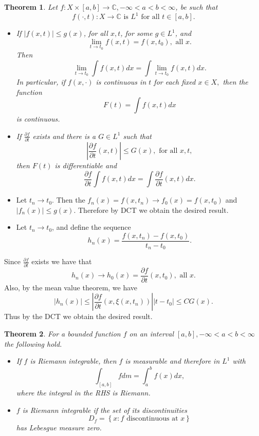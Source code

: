 \documentclass[12pt]{report}
\newtheorem{theorem}{Theorem}[section]
\begin{document}
\begin{theorem} Let $f: X \times [a,b] \longrightarrow
\mathbb{C}, - \infty < a < b < \infty$, be such that
\[ f(\cdot, t): X \longrightarrow \mathbb{C} \mbox{ is }  L^1
\mbox{ for all } t
\in [a,b].
\]
\begin{itemize}
\item[(a)]  If $|f(x, t)| \le g(x)$, for all $ x, t$, for some $g \in L^1$, and
\[
\lim_{t \to t_0} f(x, t) = f(x, t_0), \mbox{ all } x.
\] Then
\[
\lim_{t \to t_0} \int f(x, t) dx = \int \lim_{t \to t_0} f(x, t) dx.
\] In particular, if $f(x, \cdot)$ is continuous in $t$ for each fixed $x
\in X,$ then the function
\[ F(t) = \int f(x, t) dx
\] is continuous.
\item[(b)]  If $\frac{\partial f}{\partial t}$ exists and there is a $G
\in L^1$ such that
\[
\left |\frac{\partial f}{\partial t} (x, t) \right | \le G(x), \mbox{ for all } x,
t,
\] then $F(t)$ is differentiable and
\[
\frac{\partial f}{\partial t} \int f(x, t) dx = \int \frac{\partial f}{\partial
t} (x, t) dx.
\]
\end{itemize}
\end{theorem}

\medskip
{} 
\begin{itemize}
\item[(a)]  Let  $t_n \longrightarrow t_0$.  Then the $f_n(x) = f(x,  t_n)
\longrightarrow f_0 (x) = f(x, t_0)$ and  $\left |f_n(x) \right |
\le g(x)$.  Therefore by DCT we obtain the desired result.
\item[(b)]  Let $t_n \longrightarrow t_0$, and define the sequence
\[ h_n (x) = \frac{f(x, t_n) - f(x, t_0)}{t_n - t_0}.
\]
\end{itemize} Since $\frac{\partial f}{\partial t}$ exists we have that
\[ h_n (x) \longrightarrow h_0(x) = \frac{\partial f}{\partial t} (x, t_0),
\mbox{ all } x.
\] Also, by the mean value theorem, we have
\[ |h_n(x)| \le \left | \frac{\partial f}{\partial t} (x, \xi(x, t_n)) \right | |t -
t_0| \le CG(x).
\] Thus by the DCT we obtain the desired result.


\begin{theorem}  For  a bounded function $f$   on an interval $[a, b], -
\infty < a < b < \infty$ the following hold.
\begin{itemize}
\item[(a)]  If $f$ is Riemann integrable, then $f$ is measurable and
therefore in
$L^1$ with 
\[
\int_{[a,b]} f d m = \int^b_a f(x) dx, 
\] where the integral in the RHS is Riemann.
\item[(b)]  $f$ is Riemann integrable if  the set of its discontinuities
\[D_f = \left \{x: f \mbox{ discontinuous  at } x \right \}
\] has Lebesgue measure zero.
\end{itemize}
\end{theorem}
\end{document}
